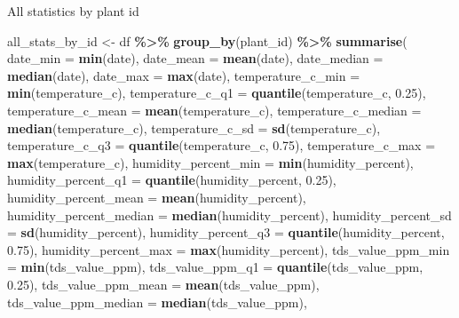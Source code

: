 \documentclass[
]{article}
\newenvironment{Shaded}{\begin{snugshade}}{\end{snugshade}}
\newcommand{\AttributeTok}[1]{\textcolor[rgb]{0.13,0.29,0.53}{#1}}
\newcommand{\FloatTok}[1]{\textcolor[rgb]{0.00,0.00,0.81}{#1}}
\newcommand{\FunctionTok}[1]{\textcolor[rgb]{0.13,0.29,0.53}{\textbf{#1}}}
\newcommand{\NormalTok}[1]{#1}
\newcommand{\OtherTok}[1]{\textcolor[rgb]{0.56,0.35,0.01}{#1}}
\newcommand{\SpecialCharTok}[1]{\textcolor[rgb]{0.81,0.36,0.00}{\textbf{#1}}}
\begin{document}
All statistics by plant id

\begin{Shaded}
\begin{Highlighting}[]
\NormalTok{all\_stats\_by\_id }\OtherTok{\textless{}{-}}\NormalTok{ df }\SpecialCharTok{\%\textgreater{}\%} \FunctionTok{group\_by}\NormalTok{(plant\_id) }\SpecialCharTok{\%\textgreater{}\%}
  \FunctionTok{summarise}\NormalTok{(}
            \AttributeTok{date\_min =} \FunctionTok{min}\NormalTok{(date),}
            \AttributeTok{date\_mean =} \FunctionTok{mean}\NormalTok{(date),}
            \AttributeTok{date\_median =} \FunctionTok{median}\NormalTok{(date),}
            \AttributeTok{date\_max =} \FunctionTok{max}\NormalTok{(date),}
            \AttributeTok{temperature\_c\_min =} \FunctionTok{min}\NormalTok{(temperature\_c),}
            \AttributeTok{temperature\_c\_q1 =} \FunctionTok{quantile}\NormalTok{(temperature\_c, }\FloatTok{0.25}\NormalTok{),}
            \AttributeTok{temperature\_c\_mean =} \FunctionTok{mean}\NormalTok{(temperature\_c),}
            \AttributeTok{temperature\_c\_median =} \FunctionTok{median}\NormalTok{(temperature\_c),}
            \AttributeTok{temperature\_c\_sd =} \FunctionTok{sd}\NormalTok{(temperature\_c),}
            \AttributeTok{temperature\_c\_q3 =} \FunctionTok{quantile}\NormalTok{(temperature\_c, }\FloatTok{0.75}\NormalTok{),}
            \AttributeTok{temperature\_c\_max =} \FunctionTok{max}\NormalTok{(temperature\_c),}
            \AttributeTok{humidity\_percent\_min =} \FunctionTok{min}\NormalTok{(humidity\_percent),}
            \AttributeTok{humidity\_percent\_q1 =} \FunctionTok{quantile}\NormalTok{(humidity\_percent, }\FloatTok{0.25}\NormalTok{),}
            \AttributeTok{humidity\_percent\_mean =} \FunctionTok{mean}\NormalTok{(humidity\_percent),}
            \AttributeTok{humidity\_percent\_median =} \FunctionTok{median}\NormalTok{(humidity\_percent),}
            \AttributeTok{humidity\_percent\_sd =} \FunctionTok{sd}\NormalTok{(humidity\_percent),}
            \AttributeTok{humidity\_percent\_q3 =} \FunctionTok{quantile}\NormalTok{(humidity\_percent, }\FloatTok{0.75}\NormalTok{),}
            \AttributeTok{humidity\_percent\_max =} \FunctionTok{max}\NormalTok{(humidity\_percent),}
            \AttributeTok{tds\_value\_ppm\_min =} \FunctionTok{min}\NormalTok{(tds\_value\_ppm),}
            \AttributeTok{tds\_value\_ppm\_q1 =} \FunctionTok{quantile}\NormalTok{(tds\_value\_ppm, }\FloatTok{0.25}\NormalTok{),}
            \AttributeTok{tds\_value\_ppm\_mean =} \FunctionTok{mean}\NormalTok{(tds\_value\_ppm),}
            \AttributeTok{tds\_value\_ppm\_median =} \FunctionTok{median}\NormalTok{(tds\_value\_ppm),}

\end{Highlighting}
\end{Shaded}
\end{document}
